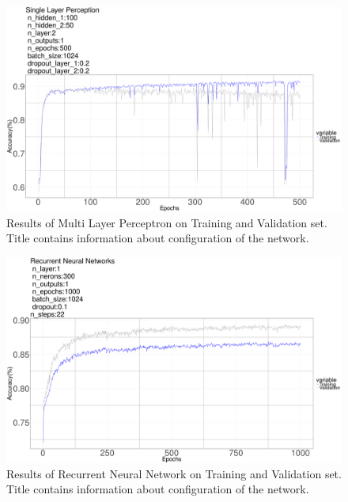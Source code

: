 \documentclass[a4paper]{article}
\begin{document}
\begin{figure}  
\centering
\includegraphics[width=1.0\textwidth]{MLP_6.png}
\caption{\label{fig:MLP_6}Results of Multi Layer Perceptron on Training and Validation set. Title contains information about configuration of the network.}
\end{figure}


\begin{figure}  
\centering
\includegraphics[width=1.0\textwidth]{RNN_1.png}
\caption{\label{fig:RNN_1}Results of Recurrent Neural Network on Training and Validation set. Title contains information about configuration of the network.}
\end{figure}
\end{document}
